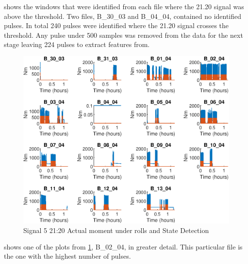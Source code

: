 \documentclass[]{article}
\begin{document}
 shows the windows that were identified from each file where the 21.20 signal was above the threshold. Two files, B\_30\_03 and B\_04\_04, contained no identified pulses. In total 240 pulses were identified where the 21.20 signal crosses the threshold. Any pulse under 500 samples was removed from the data for the next stage leaving 224 pulses to extract features from.

\begin{figure}[H]
    \centering
    \includegraphics[width=\textwidth, height=\textheight, keepaspectratio]{figures/StateDetectionFig.eps}
    \caption{Signal 5 21:20 Actual moment under rolls and State Detection}
    \label{fig:StateDetection}
\end{figure}

 shows one of the plots from \cref{fig:StateDetection}, B\_02\_04, in greater detail. This particular file is the one with the highest number of pulses.
\end{document}
